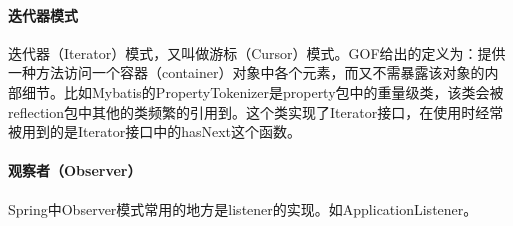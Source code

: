\documentclass[../../../interview-questions.tex]{subfiles}
\begin{document}
\paragraph{迭代器模式}

迭代器（Iterator）模式，又叫做游标（Cursor）模式。GOF给出的定义为：提供一种方法访问一个容器（container）对象中各个元素，而又不需暴露该对象的内部细节。比如Mybatis的PropertyTokenizer是property包中的重量级类，该类会被reflection包中其他的类频繁的引用到。这个类实现了Iterator接口，在使用时经常被用到的是Iterator接口中的hasNext这个函数。

\paragraph{观察者（Observer）}

Spring中Observer模式常用的地方是listener的实现。如ApplicationListener。
\end{document}
